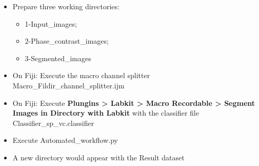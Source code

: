 \documentclass[a4paper]{article}
\begin{document}
\begin{itemize}[itemsep=-0.1em]
    \item Prepare three working directories: 
    \begin{itemize}[topsep=-0.2em]
        \item[] 1-Input\_images; 
        \item[] 2-Phase\_contrast\_images;
        \item[] 3-Segmented\_images
    \end{itemize}
    \item On Fiji: Execute the macro channel splitter {\selectfont \textcolor{Blue4}{Macro\_Fildir\_channel\_splitter.ijm}}
    \item On Fiji: Execute \textbf{Plungins  >  Labkit  >  Macro Recordable  >  Segment Images in Directory with Labkit} with the classifier file {\selectfont \textcolor{Blue4}{Classifier\_sp\_vc.classifier}}
    \item Execute \textcolor{Blue4}{Automated\_workflow.py}
    \item A new directory would appear with the Result dataset
\end{itemize}
\end{document}
